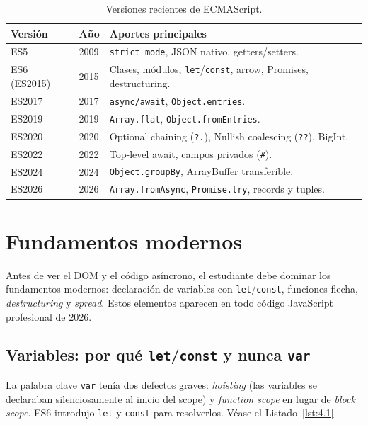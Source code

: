 \begin{table}[htbp]
\centering
\caption{Versiones recientes de ECMAScript.}
\footnotesize
\begin{tabularx}{\textwidth}{lXX}
\toprule
\textbf{Versión} & \textbf{Año} & \textbf{Aportes principales}\\
\midrule
ES5  & 2009 & \texttt{strict mode}, JSON nativo, getters/setters.\\
ES6 (ES2015) & 2015 & Clases, módulos, \texttt{let}/\texttt{const}, arrow, Promises, destructuring.\\
ES2017 & 2017 & \texttt{async/await}, \texttt{Object.entries}.\\
ES2019 & 2019 & \texttt{Array.flat}, \texttt{Object.fromEntries}.\\
ES2020 & 2020 & Optional chaining (\texttt{?.}), Nullish coalescing (\texttt{??}), BigInt.\\
ES2022 & 2022 & Top-level await, campos privados (\texttt{\#}).\\
ES2024 & 2024 & \texttt{Object.groupBy}, ArrayBuffer transferible.\\
ES2026 \cite{ecma2024} & 2026 & \texttt{Array.fromAsync}, \texttt{Promise.try}, records y tuples.\\
\bottomrule
\end{tabularx}
\end{table}

\section{Fundamentos modernos}

Antes de ver el DOM y el código asíncrono, el estudiante debe
dominar los fundamentos modernos: declaración de variables con
\texttt{let}/\texttt{const}, funciones flecha, \emph{destructuring}
y \emph{spread}. Estos elementos aparecen en todo código JavaScript
profesional de 2026.


\subsection{Variables: por qué \texttt{let}/\texttt{const} y nunca \texttt{var}}

La palabra clave \texttt{var} tenía dos defectos graves:
\emph{hoisting} (las variables se declaraban silenciosamente al
inicio del scope) y \emph{function scope} en lugar de \emph{block
scope}. ES6 introdujo \texttt{let} y \texttt{const} para resolverlos. V\'ease el Listado~\ref{lst:4.1}.


